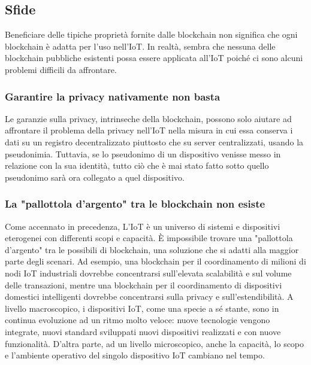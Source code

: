 \subsection{Sfide}
Beneficiare delle tipiche proprietà fornite dalle blockchain non significa che ogni blockchain è adatta per l'uso nell'IoT. In realtà, sembra che nessuna delle blockchain pubbliche esistenti possa essere applicata all'IoT poiché ci sono alcuni problemi difficili da affrontare.

\subsubsection{Garantire la privacy nativamente non basta}
Le garanzie sulla privacy, intrinseche della blockchain, possono solo aiutare ad affrontare il problema della privacy
nell'IoT nella misura in cui essa conserva i dati su un registro decentralizzato piuttosto che su server centralizzati, usando la pseudonimia. Tuttavia, se lo pseudonimo di un dispositivo venisse messo in relazione con la sua identità, tutto ciò che è mai stato fatto sotto quello pseudonimo sarà ora collegato a quel dispositivo.

\subsubsection{La "pallottola d'argento" tra le blockchain non esiste}
Come accennato in precedenza, L'IoT è un universo di sistemi e dispositivi eterogenei con differenti scopi e capacità. È impossibile trovare una "pallottola d'argento" tra le possibili di blockchain, una soluzione che si adatti alla maggior parte degli scenari. Ad esempio, una blockchain per il coordinamento di milioni di nodi IoT industriali dovrebbe concentrarsi sull'elevata scalabilità e sul volume delle transazioni, mentre una blockchain per il coordinamento di dispositivi domestici intelligenti dovrebbe concentrarsi sulla privacy e sull'estendibilità. A livello macroscopico, i dispositivi IoT, come una specie a sé stante, sono in continua evoluzione ad un ritmo molto veloce: nuove tecnologie vengono integrate, nuovi standard sviluppati nuovi dispositivi realizzati e con nuove funzionalità. D'altra parte, ad un livello microscopico, anche la capacità, lo scopo e l'ambiente operativo del singolo dispositivo IoT cambiano nel tempo.

